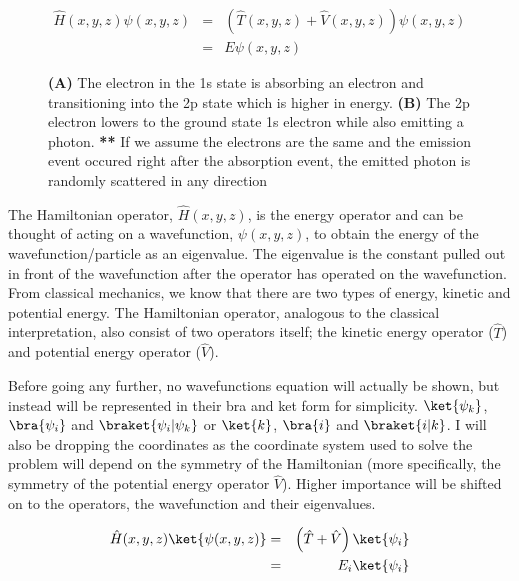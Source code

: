 \documentclass[11pt,a4paper]{book}
\newcommand{\imginput}[1]{} %
\begin{document}
	\begin{eqnarray}
		\label{eq:hamiltonian of wavefunction in cartesian}
		\hat{H} (x, y, z) \psi(x, y, z)
			&=&\left( \hat{T}(x, y, z) + \hat{V}(x, y, z) \right) \psi(x, y, z)\\
			&=&E\psi(x, y, z)
	\end{eqnarray}
	
	\begin{figure} [!ht]
		\centering
		\large
		\def\svgwidth{\columnwidth}
		\resizebox{15cm}{!}{\imginput{images/photon-electron-transition.pdf_tex}}
		\caption{{\bfseries (A)} The electron in the 1s state is absorbing an electron and transitioning into the 2p state which is higher in energy. 
			\newline
			{\bfseries (B)} The 2p electron lowers to the ground state 1s electron while also emitting a photon. \newline
			{\bfseries ***} If we assume the electrons are the same and the emission event occured right after the absorption event,  the emitted photon is randomly scattered in any direction}
		\label{fig:photon-electron-transition}
	\end{figure}	
		
	\noindent
	The Hamiltonian operator, $\hat{H}(x,y,z)$, is the energy operator and can be thought of acting on a wavefunction, $\psi(x, y , z)$, to obtain the energy of the wavefunction/particle as an eigenvalue. The eigenvalue is the constant pulled out in front of the wavefunction after the operator has operated on the wavefunction. From classical mechanics, we know that there are two types of energy, kinetic and potential energy. The Hamiltonian operator, analogous to the classical interpretation, also consist of two operators itself; the kinetic energy operator ($\hat{T}$) and potential energy operator ($\hat{V}$). 
	
	Before going any further, no wavefunctions equation will actually be shown, but instead will be represented in their bra and ket form for simplicity. $\ket{\psi_k}$, $\bra{\psi_i}$ and $\braket{\psi_i|\psi_k}$ or $\ket{k}$, $\bra{i}$ and $\braket{i|k}$. I will also be dropping the coordinates as the coordinate system used to solve the problem will depend on the symmetry of the Hamiltonian (more specifically, the symmetry of the potential energy operator $\hat{V}$). Higher importance will be shifted on to the operators, the wavefunction and their eigenvalues.
	
	\begin{eqnarray}
		\label{eq:hamiltonian of wavefunction in braket notation}
		\hat{H}(x, y, z)\ket{\psi(x, y, z)}
		&=&\left( \hat{T} + \hat{V}\right) \ket{\psi_i}\\
		&=&E_i\ket{\psi_i}
	\end{eqnarray}
	
\end{document}
